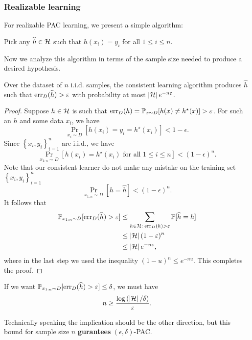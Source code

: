 \documentclass[a4paper]{article}
\begin{document}
\subsubsection{Realizable learning}

For realizable PAC learning, we present a simple algorithm:
\begin{algorithm}
Pick any $\widehat{h} \in \mathcal{H}$ such that $h(x_i) = y_i$
for all $1 \leq i \leq n$.
\end{algorithm}
Now we analyze this algorithm in terms of the sample size needed
to produce a desired hypothesis.

\begin{thm}
  Over the dataset of $n$ i.i.d. samples,
  the consistent learning algorithm produces $\hat{h}$ such
  that $\operatorname{err}_D(\widehat{h}) > \varepsilon$ with probability
  at most $\left\lvert \mathcal{H}\right\rvert e^{-n\varepsilon}$.
\end{thm}
\begin{proof}
  Suppose $h \in \mathcal{H}$ is such that
  $\operatorname{err}_D(h) = \mathbb{P}_{x \sim D} [h(x) \neq h^\star(x)] > \varepsilon$.
  For such an $h$ and some data $x_i$, we have
  \[
  \Pr_{x_i \sim D} [h(x_i) = y_i = h^\star(x_i)] < 1 - \epsilon.
  \]
  Since $\left\{ x_i, y_i \right\}_{i=1}^n$ are i.i.d., we have
  \[
  \Pr_{x_{1:n} \sim D}[h(x_i) = h^\star(x_i) \text{ for all
  $1 \leq i \leq n$}] < (1 - \epsilon)^n.
  \]
  Note that our consistent learner do not make any mistake
  on the training set $\left\{ x_i, y_i \right\}_{i=1}^n$
  \[
  \Pr_{x_{1 : n} \sim D} [h = \hat{h}] < (1 - \epsilon)^n.
  \]
  It follows that
  \[
  \begin{aligned}
    \mathbb{P}_{x_{1 : n} \sim D} [\operatorname{err}_D (\widehat{h}) > \varepsilon]
    & \leq \sum_{h \in \mathcal{H}: \; \operatorname{err}_D(h) > \varepsilon}
    \mathbb{P}[\widehat{h} = h]  \\
    & \leq \left\lvert \mathcal{H}\right\rvert (1 - \varepsilon)^n \\
    & \leq \left\lvert \mathcal{H}\right\rvert e^{-n\varepsilon},
  \end{aligned}
  \]
  where in the last step we used the inequality
  $(1 - u)^n \leq e^{-nu}$. This completes the proof.
\end{proof}

\begin{cor}
  If we want $\mathbb{P}_{x_{1 : n} \sim D} [\operatorname{err}_D (\widehat{h}) > \varepsilon]
  \leq \delta$, we must have
  \[
  n \geq \frac{\log \left( \left\lvert \mathcal{H}\right\rvert / \delta \right)}{\varepsilon}.
  \]
\end{cor}
Technically speaking the implication should be the other direction,
but this bound for sample size $n$
\textbf{gurantees} $(\epsilon, \delta)$-PAC.
\end{document}
